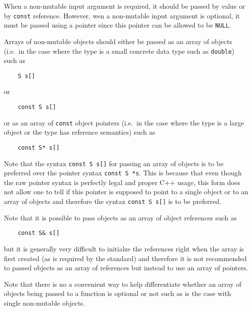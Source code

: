 When a non-mutable input argument is required, it should be passed by
value or by {}\texttt{const} reference.  However, wen a non-mutable
input argument is optional, it must be passed using a pointer since
this pointer can be allowed to be {}\texttt{NULL}.

Arrays of non-mutable objects should either be passed as an array of
objects (i.e.~in the case where the type is a small concrete data type
such as {}\texttt{double}) such as

{\scriptsize\begin{verbatim}
    S s[]
\end{verbatim}}

{}\noindent{}or

{\scriptsize\begin{verbatim}
    const S s[]
\end{verbatim}}

{}\noindent{}or as an array of {}\texttt{const} object pointers (i.e.~in the case
where the type is a large object or the type has reference semantics) such as

{\scriptsize\begin{verbatim}
    const S* s[]
\end{verbatim}}

Note that the syntax {}\texttt{const S s[]} for passing an array of
objects is to be preferred over the pointer syntax {}\texttt{const S
*s}.  This is because that even though the raw pointer syntax is
perfectly legal and proper C++ usage, this form does not allow one to
tell if this pointer is supposed to point to a single object or to an
array of objects and therefore the syntax {}\texttt{const S s[]} is to
be preferred.

Note that it is possible to pass objects as an array of object
references such as

{\scriptsize\begin{verbatim}
    const S& s[]
\end{verbatim}}

{}\noindent{}but it is generally very difficult to initialze the
references right when the array is first created (as is required by
the standard) and therefore it is not recommended to passed objects as
an array of references but instead to use an array of pointers.

Note that there is no a convenient way to help differentiate whether
an array of objects being passed to a function is optional or not such
as is the case with single non-mutable objects.

